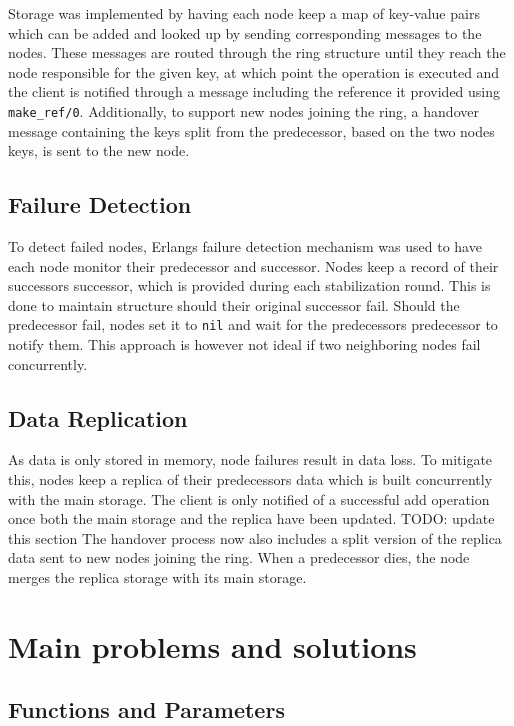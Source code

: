 \documentclass[a4paper, 11pt]{article}
\begin{document}
Storage was implemented by having each node keep a map of key-value pairs which can be added and looked up by sending corresponding messages to the nodes.
These messages are routed through the ring structure until they reach the node responsible for the given key,
at which point the operation is executed and the client is notified through a message including the reference it provided using \texttt{make\_ref/0}.
Additionally, to support new nodes joining the ring, a handover message containing the keys split from the predecessor, based on the two nodes keys, is sent to the new node.

\subsection{Failure Detection}

To detect failed nodes, Erlangs failure detection mechanism was used to have each node monitor their predecessor and successor.
Nodes keep a record of their successors successor, which is provided during each stabilization round. This is done to maintain structure should their original successor fail.
Should the predecessor fail, nodes set it to \texttt{nil} and wait for the predecessors predecessor to notify them.
This approach is however not ideal if two neighboring nodes fail concurrently.

\subsection{Data Replication}

As data is only stored in memory, node failures result in data loss. To mitigate this, nodes keep a replica of their predecessors data which is built concurrently with the main storage.
The client is only notified of a successful add operation once both the main storage and the replica have been updated.
TODO: update this section
The handover process now also includes a split version of the replica data sent to new nodes joining the ring.
When a predecessor dies, the node merges the replica storage with its main storage.

\section{Main problems and solutions}

\subsection{Functions and Parameters}
\end{document}
